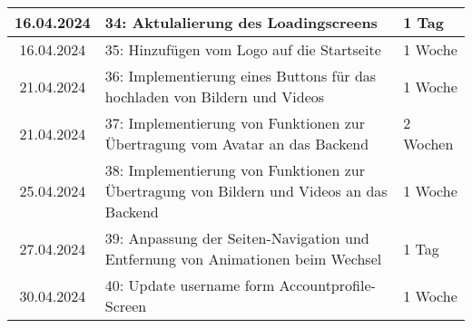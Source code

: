 \begin{table}[h]
{\begin{tabular}{|c|l|l|}
		\hline
        {16.04.2024} & {34: Aktulalierung des Loadingscreens} & {1 Tag} \\
		\hline
        {16.04.2024} & {35: Hinzufügen vom Logo auf die Startseite} & {1 Woche} \\
		\hline
        {21.04.2024} & {36: Implementierung eines Buttons für das hochladen von Bildern und Videos} & {1 Woche} \\
		\hline
        {21.04.2024} & {37: Implementierung von Funktionen zur Übertragung vom Avatar an das Backend} & {2 Wochen} \\
		\hline
        {25.04.2024} & {38: Implementierung von Funktionen zur Übertragung von Bildern und Videos an das Backend} & {1 Woche} \\
		\hline
        {27.04.2024} & {39: Anpassung der Seiten-Navigation und Entfernung von Animationen beim Wechsel} & {1 Tag} \\
		\hline
		{30.04.2024} & {40: Update username form Accountprofile-Screen} & {1 Woche} \\
		\hline
	\end{tabular}
	}
\end{table}


